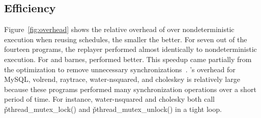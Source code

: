 \subsection{Efficiency} \label{sec:tern-efficient}

Figure~\ref{fig:overhead} shows the relative overhead of \tern over
nondeterministic execution when reusing schedules, the smaller the better.  For seven out of
the fourteen programs, the replayer performed almost identically to
nondeterministic execution. For \pbzip and barnes, \tern performed
better.  This speedup came partially from the optimization to remove
unnecessary synchronizations~\cite{cui:tern:osdi10}.  \tern's overhead
for MySQL, volrend, raytrace, water-nsquared, and choleskey is relatively
large because these programs performed many synchronization operations
over a short period of time.  For instance, water-nsquared and cholesky
both call \v{pthread\_mutex\_lock()} and \v{pthread\_mutex\_unlock()} in a
tight loop.




